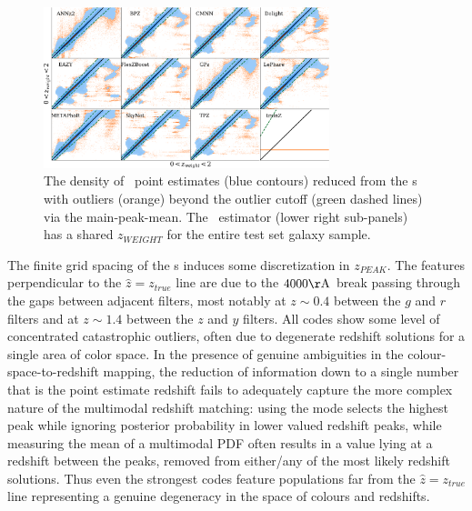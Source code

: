 \begin{figure}
	\centering
	\includegraphics[width=0.74\textwidth]{figures/pzdc1/ZWEIGHT_AIM.png}
	\caption[The density of \pz\ point estimates reduced from the \pzpdf s via the main-peak-mean for the codes considered in ]
	{The density of \pz\ point estimates (blue contours) reduced from the \pzpdf s with outliers (orange) beyond the outlier cutoff (green dashed lines) via the main-peak-mean.
		The \trainz\ estimator (lower right sub-panels) has a shared $z_{WEIGHT}$ for the entire test set galaxy sample.
	}
\end{figure}

The finite grid spacing of the \pzpdf s induces some discretization in $z_{PEAK}$.%
The features perpendicular to the $\hat{z} = z_{true}$ line are due to the $4000 \rm{\AA}$ break passing through the gaps between adjacent filters, most notably at $z \sim 0.4$ between the $g$ and $r$ filters and at $z \sim 1.4$ between the $z$ and $y$ filters.  
All codes show some level of concentrated catastrophic outliers, often due to degenerate redshift solutions for a single area of color space.  
In the presence of genuine ambiguities in the colour-space-to-redshift mapping, the reduction of information down to a single number that is the point estimate redshift fails to adequately capture the more complex nature of the multimodal redshift matching: 
using the mode selects the highest peak while ignoring posterior probability in lower valued redshift peaks, while measuring the mean of a multimodal PDF often results in a value lying at a redshift between the peaks, removed from either/any of the most likely redshift solutions.  
Thus even the strongest codes feature populations far from the $\hat{z} = z_{true}$ line representing a genuine degeneracy in the space of colours and redshifts.

